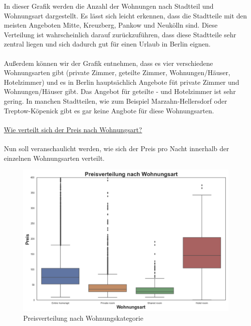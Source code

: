 \documentclass[12pt]{article}
\begin{document}
\begin{text}
In dieser Grafik werden die Anzahl der Wohnungen nach Stadtteil und Wohnungsart dargestellt. Es lässt sich leicht erkennen, dass die Stadtteile mit den meisten Angeboten Mitte, Kreuzberg, Pankow und Neukölln sind. Diese Verteilung ist wahrscheinlich darauf zurückzuführen, dass diese Stadtteile sehr zentral liegen und sich dadurch gut für einen Urlaub in Berlin eignen. 
\\\\
Außerdem können wir der Grafik entnehmen, dass es vier verschiedene Wohnungsarten gibt (private Zimmer, geteilte Zimmer, Wohnungen/Häuser, Hotelzimmer) und es in Berlin hauptsächlich Angebote füt private Zimmer und Wohnungen/Häuser gibt. Das Angebot für geteilte - und Hotelzimmer ist sehr gering. In manchen Stadtteilen, wie zum Beispiel Marzahn-Hellersdorf oder Treptow-Köpenick gibt es gar keine Angbote für diese Wohnungsarten.
\\\\
\underline{Wie verteilt sich der Preis nach Wohnungsart?}
\\\\
Nun soll veranschaulicht werden, wie sich der Preis pro Nacht innerhalb der einzelnen Wohnungsarten verteilt.
\begin{figure}[h]
 \includegraphics[width=1.1\textwidth]{RoomTypeBild.PNG}
 \caption{Preisverteilung nach Wohnungskategorie}
\end{figure}


\end{text}
\end{document}
